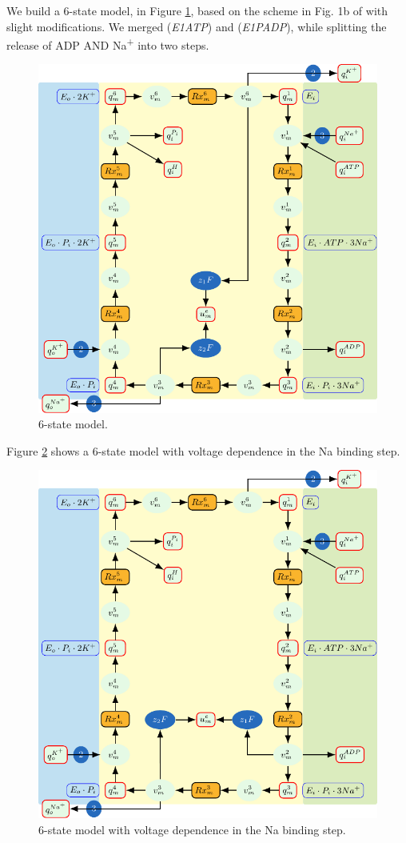 \documentclass{biophys-new}
\begin{document}
We build a 6-state model, in Figure \ref{fig:6state}, based on the scheme in Fig. 1b of \cite{nguyen_structural_2022} with slight modifications.
We merged (\textit{E1\textperiodcentered [3Na]\textperiodcentered ATP}) and (\textit{E1\textperiodcentered [3Na]\textperiodcentered P\text{-}ADP}), 
while splitting the release of ADP AND Na\textsuperscript{+} into two steps.
\begin{figure}
\caption{6-state model.}
      \label{fig:6state}
\centering
\includegraphics[width=0.7\linewidth]{6state_1.pdf}
\end{figure}



Figure \ref{fig:6state_v3} shows a 6-state model with voltage dependence in the Na binding step.
\begin{figure}
\caption{6-state model with voltage dependence in the Na binding step.}
\label{fig:6state_v3}
\centering
\includegraphics[width=0.7\linewidth]{6state_3.pdf}
\end{figure}
\end{document}
